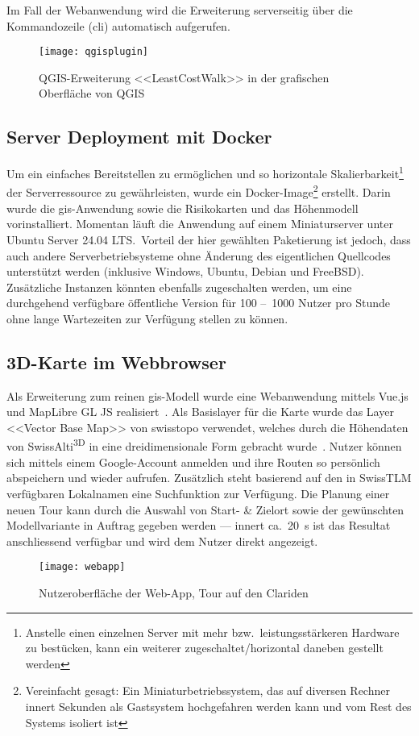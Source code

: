 Im Fall der Webanwendung wird die Erweiterung serverseitig über die Kommandozeile (\acrshort{cli}) automatisch aufgerufen.

\begin{figure}[H]
  \centering
  \texttt{[image: qgisplugin]}
  \caption{QGIS-Erweiterung <<LeastCostWalk>> in der grafischen Oberfläche von QGIS}\label{fig:qgisplugin}
\end{figure}

\subsection{Server Deployment mit Docker}

Um ein einfaches Bereitstellen zu ermöglichen und so horizontale Skalierbarkeit\footnote{Anstelle einen einzelnen Server mit mehr bzw.\ leistungsstärkeren Hardware zu bestücken, kann ein weiterer zugeschaltet/horizontal daneben gestellt werden} der Serverressource zu gewährleisten, wurde ein Docker-Image\footnote{Vereinfacht gesagt: Ein Miniaturbetriebssystem, das auf diversen Rechner innert Sekunden als Gastsystem hochgefahren werden kann und vom Rest des Systems isoliert ist} erstellt. Darin wurde die \gls{gis}-Anwendung sowie die Risikokarten und das Höhenmodell vorinstalliert. Momentan läuft die Anwendung auf einem Miniaturserver unter Ubuntu Server 24.04 LTS.\ Vorteil der hier gewählten Paketierung ist jedoch, dass auch andere Serverbetriebsysteme ohne Änderung des eigentlichen Quellcodes unterstützt werden (inklusive Windows, Ubuntu, Debian und FreeBSD). Zusätzliche Instanzen könnten ebenfalls zugeschalten werden, um eine durchgehend verfügbare öffentliche Version für 100 --~1000 Nutzer pro Stunde ohne lange Wartezeiten zur Verfügung stellen zu können.

\clearpage
\subsection{3D-Karte im Webbrowser}

Als Erweiterung zum reinen \gls{gis}-Modell wurde eine Webanwendung mittels Vue.js und MapLibre GL JS realisiert~\cite{vuedevman}\cite{maplibregljs}. Als Basislayer für die Karte wurde das Layer <<Vector Base Map>> von swisstopo verwendet, welches durch die Höhendaten von SwissAlti\textsuperscript{3D} in eine dreidimensionale Form gebracht wurde~\cite{basevtprod}\cite{alti3dprod}. Nutzer können sich mittels einem Google-Account anmelden und ihre Routen so persönlich abspeichern und wieder aufrufen. Zusätzlich steht basierend auf den in SwissTLM verfügbaren Lokalnamen eine Suchfunktion zur Verfügung.
Die Planung einer neuen Tour kann durch die Auswahl von Start- \& Zielort sowie der gewünschten Modellvariante in Auftrag gegeben werden --- innert ca.\ \qty{20}{s} ist das Resultat anschliessend verfügbar und wird dem Nutzer direkt angezeigt.


  \begin{figure}[H]
    \centering
    \texttt{[image: webapp]}
    \caption{Nutzeroberfläche der Web-App, Tour auf den Clariden}\label{fig:mainui}
  \end{figure}



